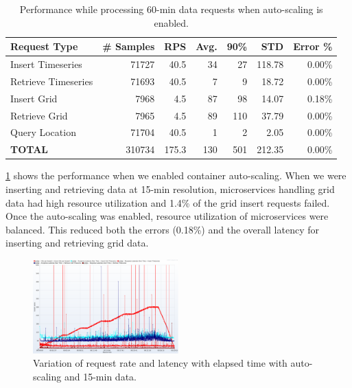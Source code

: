\documentclass[conference]{IEEEtran}
\begin{document}
\begin{table}[tb!]
\caption{Performance while processing 60-min data requests when auto-scaling is enabled.}
\begin{center}
\begin{adjustbox}{width=0.45\textwidth}
\footnotesize
\begin{tabular}{|l|r|r|r|r|r|r|}
\hline
\textbf{Request Type} & \textbf{\# Samples} & \textbf{RPS} & \textbf{Avg.} & \textbf{90\%} & \textbf{STD} & \textbf{Error \%}\\ \hline
Insert Timeseries & 71727 & 40.5 & 34 & 27 & 118.78 & 0.00\% \\ \hline
Retrieve Timeseries & 71693 & 40.5 & 7 & 9 & 18.72 & 0.00\% \\ \hline
Insert Grid & 7968 & 4.5 & 87 & 98 & 14.07 & 0.18\% \\ \hline
Retrieve Grid & 7965 & 4.5 & 89 & 110 & 37.79 & 0.00\% \\ \hline
Query Location & 71704 & 40.5 & 1 & 2 & 2.05 & 0.00\% \\ \hline
\textbf{TOTAL} & 310734 & 175.3 & 130 & 501 & 212.35 & 0.00\% \\ \hline
\end{tabular}
\end{adjustbox}
\label{ptab:obs_all_auto_15_min_summary_throughput}
\end{center}
\end{table}

\cref{ptab:obs_all_auto_15_min_summary_throughput} shows the performance when we enabled container auto-scaling. When we were inserting and retrieving data at 15-min resolution, microservices handling grid data had high resource utilization and 1.4\% of the grid insert requests failed. Once the auto-scaling was enabled, resource utilization of microservices were balanced. This reduced both the errors (0.18\%) and the overall latency for inserting and retrieving grid data.

\begin{figure}[b!]
\centerline{\includegraphics[width=0.5\textwidth]{results/obs/all_auto/obs_all_auto_15m_res_latencies_against_hits.png}}
\caption{Variation of request rate and latency with elapsed time with auto-scaling and 15-min data.}
\label{pfi:test_obs_auto_all_15_min_latency_vs_hits}
\end{figure}
\end{document}
